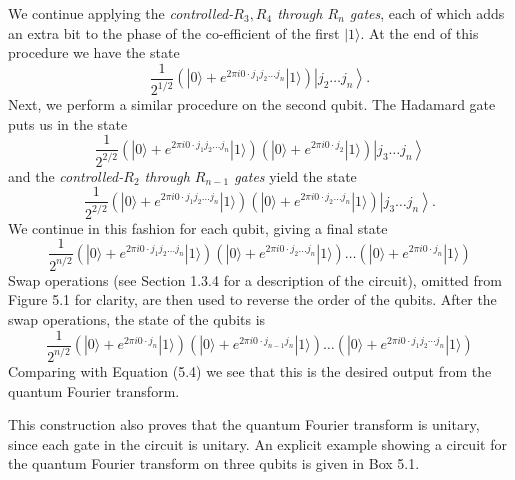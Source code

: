 We continue applying the \textit{controlled-$R_{3}, R_{4}$ through $R_{n}$ gates}, each of which adds an extra bit to the phase of the co-efficient of the first $|1\rangle$. At the end of this procedure we have the state
\begin{equation}
    \frac{1}{2^{1 / 2}}\left(|0\rangle+e^{2 \pi i 0 \cdot j_{1} j_{2} \ldots j_{n}}|1\rangle\right)\left|j_{2} \ldots j_{n}\right\rangle. \tag{5.14}
\end{equation}
Next, we perform a similar procedure on the second qubit. The Hadamard gate puts us in the state
\begin{equation}
    \frac{1}{2^{2 / 2}}\left(|0\rangle+e^{2 \pi i 0 \cdot j_{1} j_{2} \ldots j_{n}}|1\rangle\right)\left(|0\rangle+e^{2 \pi i 0 \cdot j_{2}}|1\rangle\right)\left|j_{3} \ldots j_{n}\right\rangle \tag{5.15}
\end{equation}
and the \textit{controlled-$R_{2}$ through $R_{n-1}$ gates} yield the state
\begin{equation}
    \frac{1}{2^{2 / 2}}\left(|0\rangle+e^{2 \pi i 0 \cdot j_{1} j_{2} \ldots j_{n}}|1\rangle\right)\left(|0\rangle+e^{2 \pi i 0 \cdot j_{2} \ldots j_{n}}|1\rangle\right)\left|j_{3} \ldots j_{n}\right\rangle. \tag{5.16}
\end{equation}
We continue in this fashion for each qubit, giving a final state
\begin{equation}
    \frac{1}{2^{n / 2}}\left(|0\rangle+e^{2 \pi i 0 \cdot j_{1} j_{2} \ldots j_{n}}|1\rangle\right)\left(|0\rangle+e^{2 \pi i 0 \cdot j_{2} \ldots j_{n}}|1\rangle\right) \ldots\left(|0\rangle+e^{2 \pi i 0 \cdot j_{n}}|1\rangle\right) \tag{5.17}
\end{equation}
Swap operations (see Section 1.3.4 for a description of the circuit), omitted from Figure 5.1 for clarity, are then used to reverse the order of the qubits. After the swap operations, the state of the qubits is
\begin{equation}
    \frac{1}{2^{n / 2}}\left(|0\rangle+e^{2 \pi i 0 \cdot j_{n}}|1\rangle\right)\left(|0\rangle+e^{2 \pi i 0 \cdot j_{n-1} j_{n}}|1\rangle\right) \ldots\left(|0\rangle+e^{2 \pi i 0 \cdot j_{1} j_{2} \cdots j_{n}}|1\rangle\right) \tag{5.18}
\end{equation}
Comparing with Equation (5.4) we see that this is the desired output from the quantum Fourier transform. 

This construction also proves that the quantum Fourier transform is unitary, since each gate in the circuit is unitary. An explicit example showing a circuit for the quantum Fourier transform on three qubits is given in Box 5.1.

